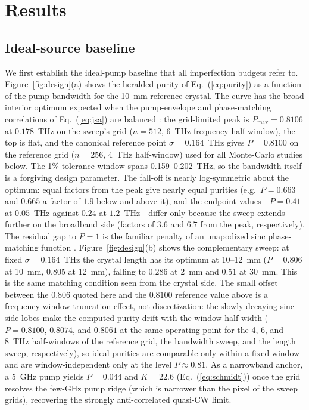 \section{Results}\label{sec:results}

\subsection{Ideal-source baseline}

We first establish the ideal-pump baseline that all imperfection budgets
refer to. Figure~\ref{fig:design}(a) shows the heralded purity of
Eq.~(\ref{eq:purity}) as a function of the pump bandwidth for the 10~mm
reference crystal. The curve has the broad interior optimum expected
when the pump-envelope and phase-matching correlations of
Eq.~(\ref{eq:jsa}) are balanced \cite{grice1997,law2000,mosley2008}:
the grid-limited peak is $P_{\max} = 0.8106$ at $0.178$~THz on the
sweep's grid ($n = 512$, 6~THz frequency half-window), the top is
flat, and the canonical reference point $\sigma = 0.164$~THz gives
$P = 0.8100$ on the reference grid ($n = 256$, 4~THz half-window) used
for all Monte-Carlo studies below. The 1\% tolerance
window spans 0.159--0.202~THz, so the bandwidth itself is a forgiving
design parameter. The fall-off is nearly log-symmetric about the
optimum: equal factors from the peak give nearly equal purities
(e.g.\ $P = 0.663$ and $0.665$ a factor of $1.9$ below and above it),
and the endpoint values---$P = 0.41$ at $0.05$~THz against $0.24$ at
$1.2$~THz---differ only because the sweep extends further on the
broadband side (factors of $3.6$ and $6.7$ from the peak,
respectively). The residual
gap to $P = 1$ is the familiar penalty of an unapodized sinc
phase-matching function \cite{branczyk2011,graffitti2018}.
Figure~\ref{fig:design}(b) shows the complementary sweep: at fixed
$\sigma = 0.164$~THz the crystal length has its optimum at 10--12~mm
($P = 0.806$ at 10~mm, $0.805$ at 12~mm), falling to $0.286$ at 2~mm
and $0.51$ at 30~mm. This is the same matching condition seen from the
crystal side. The small offset between the $0.806$ quoted here and the
$0.8100$ reference value above is a frequency-window truncation effect,
not discretization: the slowly decaying sinc side lobes make the
computed purity drift with the window half-width ($P = 0.8100$,
$0.8074$, and $0.8061$ at the same operating point for the 4, 6, and
8~THz half-windows of the reference grid, the bandwidth sweep, and the
length sweep, respectively), so ideal purities are comparable only
within a fixed window and are window-independent only at the level
$P \approx 0.81$. As a narrowband anchor, a 5~GHz pump yields
$P = 0.044$ and $K = 22.6$ (Eq.~(\ref{eq:schmidt})) once the
grid resolves the few-GHz pump ridge (which is narrower than the pixel
of the sweep grids), recovering the strongly anti-correlated quasi-CW
limit.

